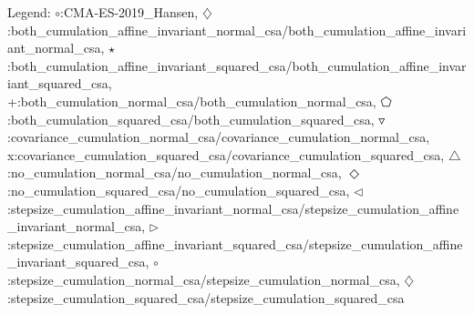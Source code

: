 Legend: {\color{CornflowerBlue}$\circ$}:CMA-ES-2019\_Hansen, {\color{Orange}$\diamondsuit$}:both\_cumulation\_affine\_invariant\_normal\_csa/both\_cumulation\_affine\_invariant\_normal\_csa, {\color{Green}$\star$}:both\_cumulation\_affine\_invariant\_squared\_csa/both\_cumulation\_affine\_invariant\_squared\_csa, {\color{red}+}:both\_cumulation\_normal\_csa/both\_cumulation\_normal\_csa, {\color{magenta}$\pentagon$}:both\_cumulation\_squared\_csa/both\_cumulation\_squared\_csa, {\color{brown}$\triangledown$}:covariance\_cumulation\_normal\_csa/covariance\_cumulation\_normal\_csa, {{}x}:covariance\_cumulation\_squared\_csa/covariance\_cumulation\_squared\_csa, {{}$\triangle$}:no\_cumulation\_normal\_csa/no\_cumulation\_normal\_csa, {{}$\Diamond$}:no\_cumulation\_squared\_csa/no\_cumulation\_squared\_csa, {{}$\triangleleft$}:stepsize\_cumulation\_affine\_invariant\_normal\_csa/stepsize\_cumulation\_affine\_invariant\_normal\_csa, {{}$\triangleright$}:stepsize\_cumulation\_affine\_invariant\_squared\_csa/stepsize\_cumulation\_affine\_invariant\_squared\_csa, {{}$\circ$}:stepsize\_cumulation\_normal\_csa/stepsize\_cumulation\_normal\_csa, {{}$\diamondsuit$}:stepsize\_cumulation\_squared\_csa/stepsize\_cumulation\_squared\_csa